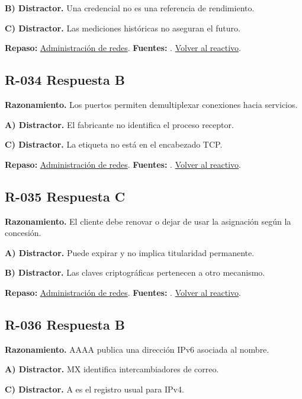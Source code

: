 \textbf{B) Distractor. }Una credencial no es una referencia de rendimiento.

\textbf{C) Distractor. }Las mediciones históricas no aseguran el futuro.

\textbf{Repaso:} \hyperref[sec:r2]{Administración de redes}. \textbf{Fuentes:} \cite{rfc2131,rfc1034,rfc9293,networks}. \hyperref[q:R-033]{Volver al reactivo}.\par\medskip

\subsection*{R-034 \quad Respuesta B}\label{s:R-034}
\textbf{Razonamiento.} Los puertos permiten demultiplexar conexiones hacia servicios.

\textbf{A) Distractor. }El fabricante no identifica el proceso receptor.

\textbf{C) Distractor. }La etiqueta no está en el encabezado TCP.

\textbf{Repaso:} \hyperref[sec:r2]{Administración de redes}. \textbf{Fuentes:} \cite{rfc2131,rfc1034,rfc9293,networks}. \hyperref[q:R-034]{Volver al reactivo}.\par\medskip

\subsection*{R-035 \quad Respuesta C}\label{s:R-035}
\textbf{Razonamiento.} El cliente debe renovar o dejar de usar la asignación según la concesión.

\textbf{A) Distractor. }Puede expirar y no implica titularidad permanente.

\textbf{B) Distractor. }Las claves criptográficas pertenecen a otro mecanismo.

\textbf{Repaso:} \hyperref[sec:r2]{Administración de redes}. \textbf{Fuentes:} \cite{rfc2131,rfc1034,rfc9293,networks}. \hyperref[q:R-035]{Volver al reactivo}.\par\medskip

\subsection*{R-036 \quad Respuesta B}\label{s:R-036}
\textbf{Razonamiento.} AAAA publica una dirección IPv6 asociada al nombre.

\textbf{A) Distractor. }MX identifica intercambiadores de correo.

\textbf{C) Distractor. }A es el registro usual para IPv4.

